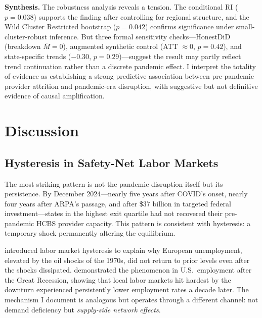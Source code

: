 \documentclass[12pt]{article}
\begin{document}
\textbf{Synthesis.} The robustness analysis reveals a tension. The conditional RI ($p = 0.038$) supports the finding after controlling for regional structure, and the Wild Cluster Restricted bootstrap ($p = 0.042$) confirms significance under small-cluster-robust inference. But three formal sensitivity checks---HonestDiD (breakdown $\bar{M} = 0$), augmented synthetic control (ATT $\approx 0$, $p = 0.42$), and state-specific trends ($-0.30$, $p = 0.29$)---suggest the result may partly reflect trend continuation rather than a discrete pandemic effect. I interpret the totality of evidence as establishing a strong predictive association between pre-pandemic provider attrition and pandemic-era disruption, with suggestive but not definitive evidence of causal amplification.


\section{Discussion}

\subsection{Hysteresis in Safety-Net Labor Markets}

The most striking pattern is not the pandemic disruption itself but its persistence. By December 2024---nearly five years after COVID's onset, nearly four years after ARPA's passage, and after \$37 billion in targeted federal investment---states in the highest exit quartile had not recovered their pre-pandemic HCBS provider capacity. This pattern is consistent with hysteresis: a temporary shock permanently altering the equilibrium.

\citet{blanchardsummers1986} introduced labor market hysteresis to explain why European unemployment, elevated by the oil shocks of the 1970s, did not return to prior levels even after the shocks dissipated. \citet{yagan2019} demonstrated the phenomenon in U.S.\ employment after the Great Recession, showing that local labor markets hit hardest by the downturn experienced persistently lower employment rates a decade later. The mechanism I document is analogous but operates through a different channel: not demand deficiency but \emph{supply-side network effects}.
\end{document}
